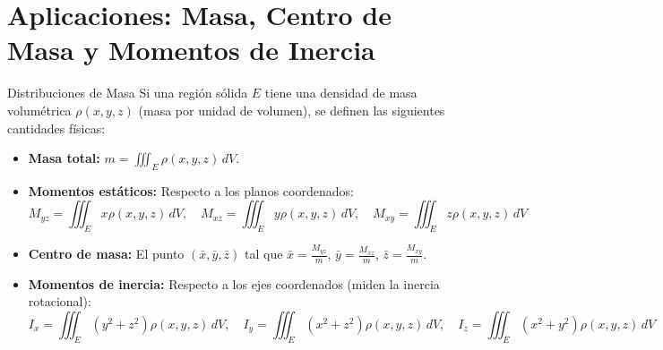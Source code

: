 \documentclass[11pt,a4paper]{article}
\begin{document}
\section{Aplicaciones: Masa, Centro de Masa y Momentos de Inercia}

\begin{definicionbox}{Distribuciones de Masa}
Si una región sólida $E$ tiene una densidad de masa volumétrica $\rho(x,y,z)$ (masa por unidad de volumen), se definen las siguientes cantidades físicas:
\begin{itemize}
    \item \textbf{Masa total:} $m = \iiint_E \rho(x,y,z) \,dV$.
    \item \textbf{Momentos estáticos:} Respecto a los planos coordenados:
    \[ M_{yz} = \iiint_E x \rho(x,y,z) \,dV, \quad M_{xz} = \iiint_E y \rho(x,y,z) \,dV, \quad M_{xy} = \iiint_E z \rho(x,y,z) \,dV \]
    \item \textbf{Centro de masa:} El punto $(\bar{x}, \bar{y}, \bar{z})$ tal que $\bar{x} = \frac{M_{yz}}{m}$, $\bar{y} = \frac{M_{xz}}{m}$, $\bar{z} = \frac{M_{xy}}{m}$.
    \item \textbf{Momentos de inercia:} Respecto a los ejes coordenados (miden la inercia rotacional):
    \[ I_x = \iiint_E (y^2+z^2) \rho(x,y,z) \,dV, \quad I_y = \iiint_E (x^2+z^2) \rho(x,y,z) \,dV, \quad I_z = \iiint_E (x^2+y^2) \rho(x,y,z) \,dV \]
\end{itemize}
\end{definicionbox}
\end{document}
